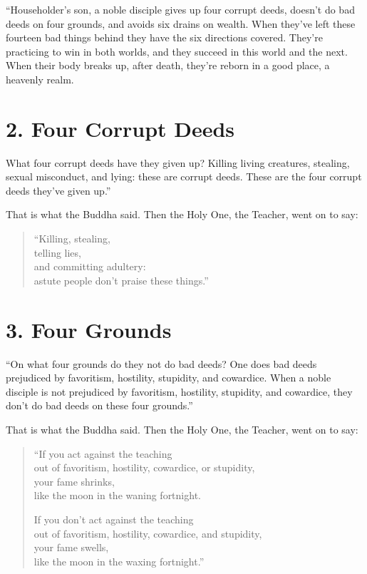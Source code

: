 \documentclass[12pt,openany]{book}%
\begin{document}
“Householder’s son, a noble disciple gives up four corrupt deeds, doesn’t do bad deeds on four grounds, and avoids six drains on wealth. When they’ve left these fourteen bad things behind they have the six directions covered. They’re practicing to win in both worlds, and they succeed in this world and the next. When their body breaks up, after death, they’re reborn in a good place, a heavenly realm. 

\section*{2. Four Corrupt Deeds }

What four corrupt deeds have they given up? Killing living creatures, stealing, sexual misconduct, and lying: these are corrupt deeds. These are the four corrupt deeds they’ve given up.” 

That is what the Buddha said. Then the Holy One, the Teacher, went on to say: 

\begin{verse}%
“Killing, stealing, \\
telling lies, \\
and committing adultery: \\
astute people don’t praise these things.” 

%
\end{verse}

\section*{3. Four Grounds }

“On what four grounds do they not do bad deeds? One does bad deeds prejudiced by favoritism, hostility, stupidity, and cowardice. When a noble disciple is not prejudiced by favoritism, hostility, stupidity, and cowardice, they don’t do bad deeds on these four grounds.” 

That is what the Buddha said. Then the Holy One, the Teacher, went on to say: 

\begin{verse}%
“If you act against the teaching \\
out of favoritism, hostility, cowardice, or stupidity, \\
your fame shrinks, \\
like the moon in the waning fortnight. 

If you don’t act against the teaching \\
out of favoritism, hostility, cowardice, and stupidity, \\
your fame swells, \\
like the moon in the waxing fortnight.” 

%
\end{verse}
\end{document}
